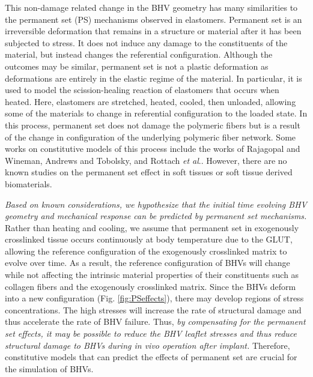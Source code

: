 	
This non-damage related change in the BHV geometry has many similarities to the permanent set (PS) mechanisms observed in elastomers. 
Permanent set is an irreversible deformation that remains in a structure or material after it has been subjected to stress. 
It does not induce any damage to the constituents of the material, but instead changes the referential configuration. 
Although the outcomes may be similar, permanent set is not a plastic deformation as deformations are entirely in the elastic regime of the material. 
In particular, it is used to model the scission-healing reaction of elastomers that occurs when heated. 
Here, elastomers are stretched, heated, cooled, then unloaded, allowing some of the materials to change in referential configuration to the loaded state. 
In this process, permanent set does not damage the polymeric fibers but is a result of the change in configuration of the underlying polymeric fiber network. 
Some works on constitutive models of this process include the works of Rajagopal and Wineman\cite{rajagopal_constitutive_1992}, Andrews and Tobolsky\cite{andrews_theory_1946}, and Rottach \textit{et al}.\cite{rottach_effect_2004, rottach_molecular_2007, rottach_permanent_2006}. 
However, there are no known studies on the permanent set effect in soft tissues or soft tissue derived biomaterials. 
	

	\emph{Based on known considerations, we hypothesize that the initial time evolving BHV geometry and mechanical response can be predicted by permanent set mechanisms.} 
	Rather than heating and cooling, we assume that permanent set in exogenously crosslinked tissue occurs continuously at body temperature due to the GLUT, allowing the reference configuration of the exogenously crosslinked matrix to evolve over time. 
	As a result, the reference configuration of BHVs will change while not affecting the intrinsic material properties of their constituents such as collagen fibers and the exogenously crosslinked matrix. 
	Since the BHVs deform into a new configuration (Fig. \ref{fig:PSeffects}), there may develop regions of stress concentrations. 
	The high stresses will increase the rate of structural damage and thus accelerate the rate of BHV failure. 
	Thus, \emph{by compensating for the permanent set effects, it may be possible to reduce the BHV leaflet stresses and thus reduce structural damage to BHVs during \textit{in vivo} operation after implant.} 
	Therefore, constitutive models that can predict the effects of permanent set are crucial for the simulation of BHVs. 
		

